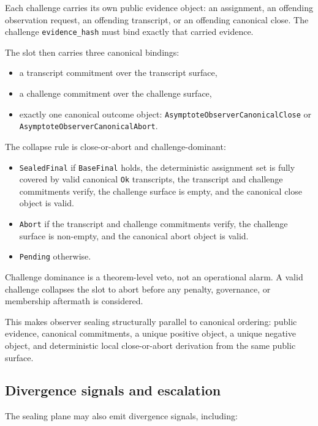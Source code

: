 \documentclass[11pt]{article}
\newcommand{\code}[1]{\texttt{#1}}
\begin{document}
Each challenge carries its own public evidence object: an assignment, an
offending observation request, an offending transcript, or an offending
canonical close. The challenge \code{evidence\_hash} must bind exactly that
carried evidence.

The slot then carries three canonical bindings:

\begin{itemize}[leftmargin=1.5em]
\item a transcript commitment over the transcript surface,
\item a challenge commitment over the challenge surface,
\item exactly one canonical outcome object:
  \code{AsymptoteObserverCanonicalClose} or
  \code{AsymptoteObserverCanonicalAbort}.
\end{itemize}

The collapse rule is close-or-abort and challenge-dominant:

\begin{itemize}[leftmargin=1.5em]
\item \code{SealedFinal} if \code{BaseFinal} holds, the deterministic
assignment set is fully covered by valid canonical \code{Ok} transcripts, the
transcript and challenge commitments verify, the challenge surface is empty,
and the canonical close object is valid.
\item \code{Abort} if the transcript and challenge commitments verify, the
challenge surface is non-empty, and the canonical abort object is valid.
\item \code{Pending} otherwise.
\end{itemize}

Challenge dominance is a theorem-level veto, not an operational alarm. A valid
challenge collapses the slot to abort before any penalty, governance, or
membership aftermath is considered.

This makes observer sealing structurally parallel to canonical ordering:
public evidence, canonical commitments, a unique positive object, a unique
negative object, and deterministic local close-or-abort derivation from the
same public surface.

\subsection{Divergence signals and escalation}

The sealing plane may also emit divergence signals, including:
\end{document}
